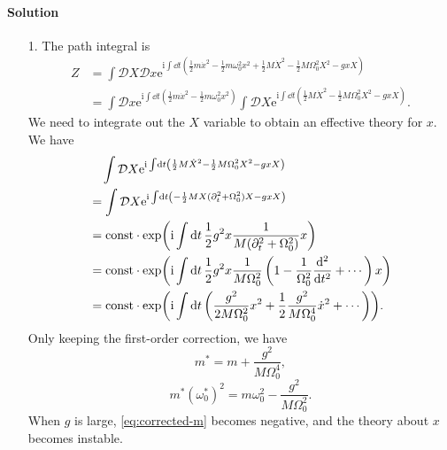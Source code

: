 \documentclass[hyperref, a4paper]{article}
\newcommand*{\ii}{\mathrm{i}}
\newcommand*{\ee}{\mathrm{e}}
\newcommand*{\const}{\mathrm{const}}
\newcommand*{\fd}[1]{\mathcal{D} #1}
\begin{document}
\paragraph{Solution} \begin{itemize}
\item[1.] The path integral is 
\begin{equation}
    \begin{aligned}
        Z &= \int \fd{X} \fd{x} \ee^{\ii \int \dd{t} \left(
            \frac{1}{2} m \dot{x}^2-\frac{1}{2} m \omega_0^2 x^2
            +\frac{1}{2} M \dot{X}^2-\frac{1}{2} M \Omega_0^2 X^2-g x X
        \right)} \\
        &= \int \fd{x} \ee^{\ii \int \dd{t} \left( \frac{1}{2} m \dot{x}^2-\frac{1}{2} m \omega_0^2 x^2 \right)}
        \int \fd{X} \ee^{\ii \int \dd{t} \left(
            \frac{1}{2} M \dot{X}^2-\frac{1}{2} M \Omega_0^2 X^2-g x X
        \right)} .
    \end{aligned}
    \label{eq:integrate-x-big-x}
\end{equation}
We need to integrate out the $X$ variable to obtain an effective theory for $x$.
We have 
\[
    \begin{aligned}
        &\quad \int \fd{X} \ee^{\ii \int \dd{t} \left(
            \frac{1}{2} M \dot{X}^2-\frac{1}{2} M \Omega_0^2 X^2-g x X
        \right)} \\
        &= \int \fd{X} \ee^{\ii \int \dd{t} \left(
            - \frac{1}{2} M X (\partial_t^2 + \Omega_0^2) X -g x X
        \right)}  \\
        &= \const \cdot \exp(\ii \int \dd{t} \frac{1}{2} g^2 x \frac{1}{M (\partial_t^2 + \Omega_0^2)} x) \\
        &= \const \cdot \exp(\ii \int \dd{t} \frac{1}{2} g^2 x \frac{1}{M \Omega_0^2} 
        \left( 1 - \frac{1}{\Omega_0^2} \dv[2]{t} + \cdots \right) x) \\
        &= \const \cdot \exp(\ii \int \dd{t} \left(
            \frac{g^2}{2 M \Omega_0^2} x^2 
            + \frac{1}{2} \frac{g^2}{M \Omega_0^4} \dot{x}^2 + \cdots
        \right)) .
    \end{aligned}
\]
Only keeping the first-order correction, we have 
\begin{equation}
    m^* = m + \frac{g^2}{M \Omega_0^4},
\end{equation}
\begin{equation}
    m^* (\omega_0^*)^2 = m \omega_0^2 - \frac{g^2}{M \Omega_0^2}.
    \label{eq:corrected-m}
\end{equation}
When $g$ is large, \eqref{eq:corrected-m} becomes negative,
and the theory about $x$ becomes instable.


\end{itemize}
\end{document}
